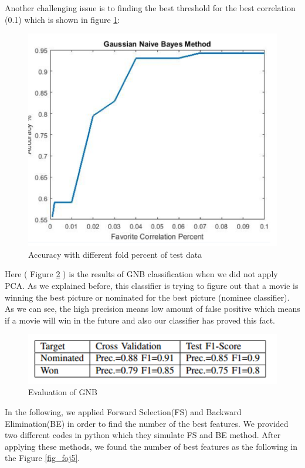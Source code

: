 \documentclass[journal,transmag]{IEEEtran}
\begin{document}
Another challenging issue is to finding the best threshold for the best correlation (0.1) which is shown in figure \ref{fig_foj3}:
\begin{figure}
\includegraphics[scale=.38]{figfoj3.png}
 \caption{Accuracy with different fold percent of test data}
\label{fig_foj3}
\end{figure}
Here ( Figure \ref{fig_foj4} ) is the results of GNB classification when we did not apply PCA. As we explained before, this classifier is trying to figure out that a movie is winning the best picture or nominated for the best picture (nominee classifier). As we can see, the high precision means low amount of false positive which means if a movie will win in the future and also our classifier has proved this fact.

\begin{figure}
\includegraphics[scale=.35]{foj4.png}
 \caption{Evaluation of GNB }
\label{fig_foj4}
\end{figure}

In the following, we applied Forward Selection(FS) and Backward Elimination(BE) in order to find the number of the best features. We provided two different codes in python which they simulate FS and BE method. After applying these methods, we found the number of best features as the following in the Figure \ref{fig_foj5}.
\end{document}
